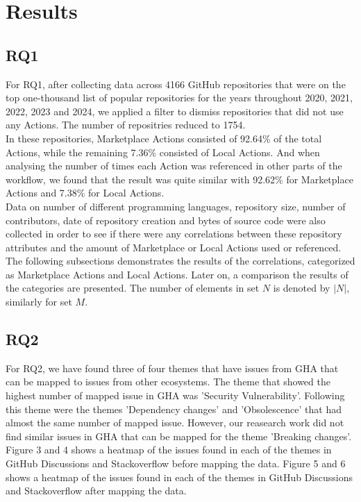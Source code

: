 \documentclass[conference]{IEEEtran}
\begin{document}

\section{Results}

  \subsection{RQ1}
      For RQ1, after collecting data across 4166 GitHub repositories that were on the top one-thousand list of popular repositories for the years throughout 2020, 2021, 2022, 2023 and 2024, we applied a filter to dismiss repositories that did not use any Actions. The number of repositries reduced to 1754. \\ 
      In these repositories, Marketplace Actions consisted of 92.64\% of the total Actions, while the remaining 7.36\% consisted of Local Actions. And when analysing the number of times each Action was referenced in other parts of the workflow, we found that the result was quite similar with 92.62\% for Marketplace Actions and 7.38\% for Local Actions. 
      \\
      Data on number of different programming languages, repository size, number of contributors, date of repository creation and bytes of source code were also collected in order to see if there were any correlations between these repository attributes and the amount of Marketplace or Local Actions used or referenced.
      The following subsections demonstrates the results of the correlations, categorized as Marketplace Actions and Local Actions. Later on, a comparison the results of the categories are presented. The number of elements in set $N$ is denoted by $|N|$, similarly for set $M$. \\

      

  \subsection{RQ2}
    For RQ2, we have found three of four themes that have issues from GHA that can be mapped to issues from other ecosystems. The theme that showed the highest number of mapped issue in GHA was 'Security Vulnerability'. Following this theme were the themes 'Dependency changes' and 'Obsolescence'  that had almost the same number of mapped issue. However, our reasearch work did not find similar issues in GHA that can be mapped for the theme 'Breaking changes'. Figure 3 and 4 shows a heatmap of the issues found in each of the themes in GitHub Discussions and Stackoverflow before mapping the data. Figure 5 and 6 shows a heatmap of the issues found in each of the themes  in GitHub Discussions and Stackoverflow after mapping the data.
\end{document}

